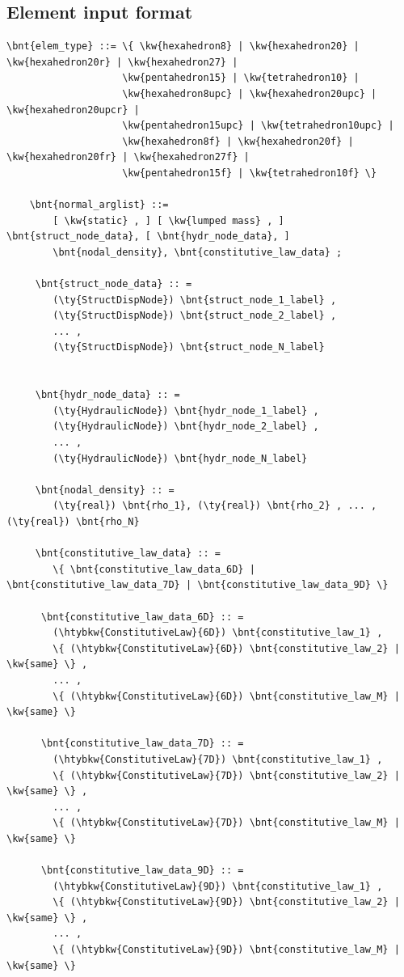 \subsection{Element input format}
\label{sec:EL:SOLID:INPUT:FORMAT}
\begin{Verbatim}[commandchars=\\\{\}]
  \bnt{elem_type} ::= \{ \kw{hexahedron8} | \kw{hexahedron20} | \kw{hexahedron20r} | \kw{hexahedron27} |
                    \kw{pentahedron15} | \kw{tetrahedron10} |
                    \kw{hexahedron8upc} | \kw{hexahedron20upc} | \kw{hexahedron20upcr} |
                    \kw{pentahedron15upc} | \kw{tetrahedron10upc} |
                    \kw{hexahedron8f} | \kw{hexahedron20f} | \kw{hexahedron20fr} | \kw{hexahedron27f} |
                    \kw{pentahedron15f} | \kw{tetrahedron10f} \}

    \bnt{normal_arglist} ::=
        [ \kw{static} , ] [ \kw{lumped mass} , ] \bnt{struct_node_data}, [ \bnt{hydr_node_data}, ]
        \bnt{nodal_density}, \bnt{constitutive_law_data} ;

     \bnt{struct_node_data} :: =
        (\ty{StructDispNode}) \bnt{struct_node_1_label} ,
        (\ty{StructDispNode}) \bnt{struct_node_2_label} ,
        ... ,
        (\ty{StructDispNode}) \bnt{struct_node_N_label}


     \bnt{hydr_node_data} :: =
        (\ty{HydraulicNode}) \bnt{hydr_node_1_label} ,
        (\ty{HydraulicNode}) \bnt{hydr_node_2_label} ,
        ... ,
        (\ty{HydraulicNode}) \bnt{hydr_node_N_label}

     \bnt{nodal_density} :: =
        (\ty{real}) \bnt{rho_1}, (\ty{real}) \bnt{rho_2} , ... , (\ty{real}) \bnt{rho_N}

     \bnt{constitutive_law_data} :: =
        \{ \bnt{constitutive_law_data_6D} | \bnt{constitutive_law_data_7D} | \bnt{constitutive_law_data_9D} \}

      \bnt{constitutive_law_data_6D} :: =
        (\htybkw{ConstitutiveLaw}{6D}) \bnt{constitutive_law_1} ,
        \{ (\htybkw{ConstitutiveLaw}{6D}) \bnt{constitutive_law_2} | \kw{same} \} ,
        ... ,
        \{ (\htybkw{ConstitutiveLaw}{6D}) \bnt{constitutive_law_M} | \kw{same} \}

      \bnt{constitutive_law_data_7D} :: =
        (\htybkw{ConstitutiveLaw}{7D}) \bnt{constitutive_law_1} ,
        \{ (\htybkw{ConstitutiveLaw}{7D}) \bnt{constitutive_law_2} | \kw{same} \} ,
        ... ,
        \{ (\htybkw{ConstitutiveLaw}{7D}) \bnt{constitutive_law_M} | \kw{same} \}

      \bnt{constitutive_law_data_9D} :: =
        (\htybkw{ConstitutiveLaw}{9D}) \bnt{constitutive_law_1} ,
        \{ (\htybkw{ConstitutiveLaw}{9D}) \bnt{constitutive_law_2} | \kw{same} \} ,
        ... ,
        \{ (\htybkw{ConstitutiveLaw}{9D}) \bnt{constitutive_law_M} | \kw{same} \}
\end{Verbatim}

